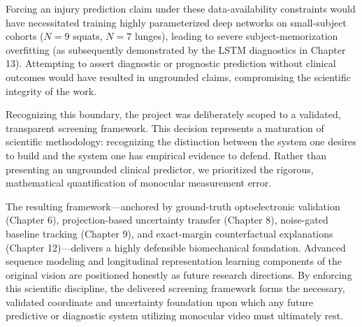 Forcing an injury prediction claim under these data-availability constraints would have necessitated training highly parameterized deep networks on small-subject cohorts ($N=9$ squats, $N=7$ lunges), leading to severe subject-memorization overfitting (as subsequently demonstrated by the LSTM diagnostics in Chapter 13). Attempting to assert diagnostic or prognostic prediction without clinical outcomes would have resulted in ungrounded claims, compromising the scientific integrity of the work.

Recognizing this boundary, the project was deliberately scoped to a validated, transparent screening framework. This decision represents a maturation of scientific methodology: recognizing the distinction between the system one desires to build and the system one has empirical evidence to defend. Rather than presenting an ungrounded clinical predictor, we prioritized the rigorous, mathematical quantification of monocular measurement error.

The resulting framework—anchored by ground-truth optoelectronic validation (Chapter 6), projection-based uncertainty transfer (Chapter 8), noise-gated baseline tracking (Chapter 9), and exact-margin counterfactual explanations (Chapter 12)—delivers a highly defensible biomechanical foundation. Advanced sequence modeling and longitudinal representation learning components of the original vision are positioned honestly as future research directions. By enforcing this scientific discipline, the delivered screening framework forms the necessary, validated coordinate and uncertainty foundation upon which any future predictive or diagnostic system utilizing monocular video must ultimately rest.